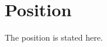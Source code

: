 \documentclass[config/load-project=false,document/type=position-paper,metadata/author={INSR Example Author},metadata/institution={INSR Example Institution},metadata/title={Position Paper Example},publication/profile={position-paper},publication/type={Position paper}]{insr}
\begin{document}
\INSRMakeTitle\section{Position}The position is stated here.
\end{document}
